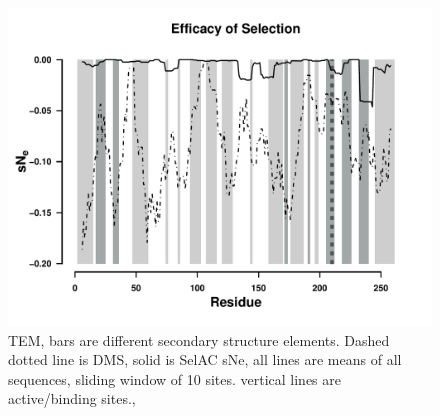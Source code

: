 \documentclass[12pt]{article}
\begin{document}
\begin{figure}[H]
     \centering
	\includegraphics[width=\textwidth]{img/sNe_slide_TEM2016}
	\caption{TEM, bars are different secondary structure elements. Dashed dotted line is DMS, solid is SelAC sNe, all lines are means of all sequences, sliding window of 10 sites. vertical lines are active/binding sites.,}
	\label{fig:tem2016_sse}
\end{figure}
\end{document}
